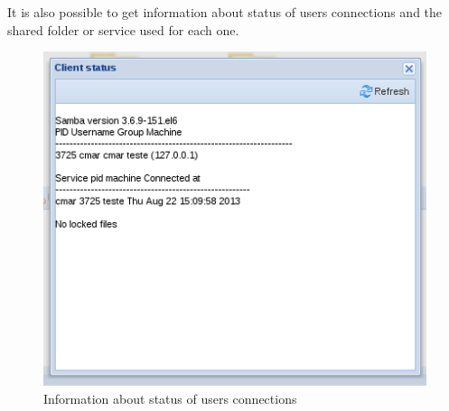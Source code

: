 It is also possible to get information about status of users connections and the shared folder or service used for each one.

\begin{figure}[H]
    \begin{center}
    \includegraphics[scale=0.38]{screenshots/etfs/etfs_client_status.png}
    \caption{Information about status of users connections}
    \label{fig:etfs_client_status}
    \end{center}
\end{figure}

